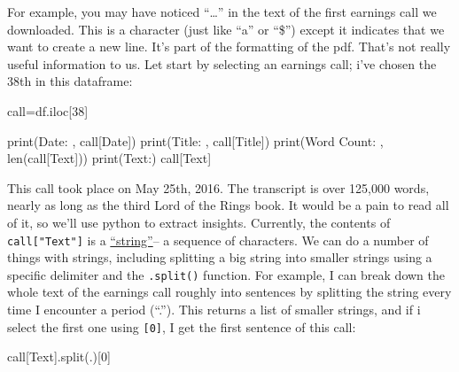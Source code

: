 \documentclass[
  letterpaper,
  DIV=11,
  numbers=noendperiod]{scrreprt}
\newenvironment{Shaded}{\begin{snugshade}}{\end{snugshade}}
\newcommand{\BuiltInTok}[1]{\textcolor[rgb]{0.00,0.23,0.31}{#1}}
\newcommand{\DecValTok}[1]{\textcolor[rgb]{0.68,0.00,0.00}{#1}}
\newcommand{\NormalTok}[1]{\textcolor[rgb]{0.00,0.23,0.31}{#1}}
\newcommand{\OperatorTok}[1]{\textcolor[rgb]{0.37,0.37,0.37}{#1}}
\newcommand{\StringTok}[1]{\textcolor[rgb]{0.13,0.47,0.30}{#1}}
\begin{document}
For example, you may have noticed ``\n\n\n\n\n\n\n\n\ldots{}'' in the
text of the first earnings call we downloaded. This is a character (just
like ``a'' or ``\$'') except it indicates that we want to create a new
line. It's part of the formatting of the pdf. That's not really useful
information to us. Let start by selecting an earnings call; i've chosen
the 38th in this dataframe:

\begin{Shaded}
\begin{Highlighting}[]
\NormalTok{call}\OperatorTok{=}\NormalTok{df.iloc[}\DecValTok{38}\NormalTok{]}

\BuiltInTok{print}\NormalTok{(}\StringTok{\textquotesingle{}Date: \textquotesingle{}}\NormalTok{, call[}\StringTok{\textquotesingle{}Date\textquotesingle{}}\NormalTok{])}
\BuiltInTok{print}\NormalTok{(}\StringTok{\textquotesingle{}Title: \textquotesingle{}}\NormalTok{, call[}\StringTok{\textquotesingle{}Title\textquotesingle{}}\NormalTok{])}
\BuiltInTok{print}\NormalTok{(}\StringTok{\textquotesingle{}Word Count: \textquotesingle{}}\NormalTok{, }\BuiltInTok{len}\NormalTok{(call[}\StringTok{\textquotesingle{}Text\textquotesingle{}}\NormalTok{]))}
\BuiltInTok{print}\NormalTok{(}\StringTok{\textquotesingle{}Text:\textquotesingle{}}\NormalTok{)}
\NormalTok{call[}\StringTok{\textquotesingle{}Text\textquotesingle{}}\NormalTok{]}
\end{Highlighting}
\end{Shaded}

This call took place on May 25th, 2016. The transcript is over 125,000
words, nearly as long as the third Lord of the Rings book. It would be a
pain to read all of it, so we'll use python to extract insights.
Currently, the contents of \texttt{call{[}"Text"{]}} is a
\href{https://docs.python.org/3/library/stdtypes.html\#text-sequence-type-str}{``string''}--
a sequence of characters. We can do a number of things with strings,
including splitting a big string into smaller strings using a specific
delimiter and the \texttt{.split()} function. For example, I can break
down the whole text of the earnings call roughly into sentences by
splitting the string every time I encounter a period (``.''). This
returns a list of smaller strings, and if i select the first one using
\texttt{{[}0{]}}, I get the first sentence of this call:

\begin{Shaded}
\begin{Highlighting}[]
\NormalTok{call[}\StringTok{\textquotesingle{}Text\textquotesingle{}}\NormalTok{].split(}\StringTok{\textquotesingle{}.\textquotesingle{}}\NormalTok{)[}\DecValTok{0}\NormalTok{]}
\end{Highlighting}
\end{Shaded}
\end{document}
